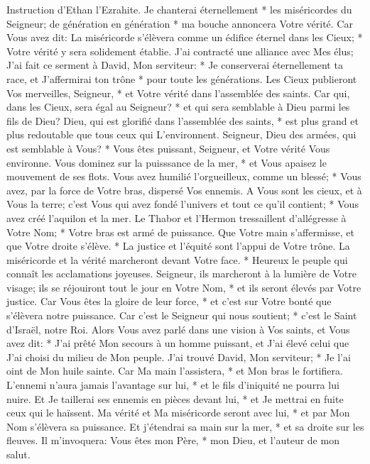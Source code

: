 Instruction d'Ethan l'Ezrahite.
Je chanterai éternellement * les miséricordes du Seigneur; de génération en génération * ma bouche annoncera Votre vérité.
Car Vous avez dit: La miséricorde s'élèvera comme un édifice éternel dans les Cieux; * Votre vérité y sera solidement établie.
J'ai contracté une alliance avec Mes élus; J'ai fait ce serment à David, Mon serviteur: *
Je conserverai éternellement ta race, et J'affermirai ton trône * pour toute les générations.
Les Cieux publieront Vos merveilles, Seigneur, * et Votre vérité dans l'assemblée des saints.
Car qui, dans les Cieux, sera égal au Seigneur? * et qui sera semblable à Dieu parmi les fils de Dieu?
Dieu, qui est glorifié dans l'assemblée des saints, * est plus grand et plus redoutable que tous ceux qui L'environnent.
Seigneur, Dieu des armées, qui est semblable à Vous? * Vous êtes puissant, Seigneur, et Votre vérité Vous environne.
Vous dominez sur la puisssance de la mer, * et Vous apaisez le mouvement de ses flots.
Vous avez humilié l'orgueilleux, comme un blessé; * Vous avez, par la force de Votre bras, dispersé Vos ennemis.
A Vous sont les cieux, et à Vous la terre; c'est Vous qui avez fondé l'univers et tout ce qu'il contient; *
Vous avez créé l'aquilon et la mer. Le Thabor et l'Hermon tressaillent d'allégresse à Votre Nom; *
Votre bras est armé de puissance. Que Votre main s'affermisse, et que Votre droite s'élève. *
La justice et l'équité sont l'appui de Votre trône. La miséricorde et la vérité marcheront devant Votre face. *
Heureux le peuple qui connaît les acclamations joyeuses. Seigneur, ils marcheront à la lumière de Votre visage;
ils se réjouiront tout le jour en Votre Nom, * et ils seront élevés par Votre justice.
Car Vous êtes la gloire de leur force, * et c'est sur Votre bonté que s'élèvera notre puissance.
Car c'est le Seigneur qui nous soutient; * c'est le Saint d'Israël, notre Roi.
Alors Vous avez parlé dans une vision à Vos saints, et Vous avez dit: * J'ai prêté Mon secours à un homme puissant, et J'ai élevé celui que J'ai choisi du milieu de Mon peuple.
J'ai trouvé David, Mon serviteur; * Je l'ai oint de Mon huile sainte.
Car Ma main l'assistera, * et Mon bras le fortifiera.
L'ennemi n'aura jamais l'avantage sur lui, * et le fils d'iniquité ne pourra lui nuire.
Et Je taillerai ses ennemis en pièces devant lui, * et Je mettrai en fuite ceux qui le haïssent.
Ma vérité et Ma miséricorde seront avec lui, * et par Mon Nom s'élèvera sa puissance.
Et j'étendrai sa main sur la mer, * et sa droite sur les fleuves.
Il m'invoquera: Vous êtes mon Père, * mon Dieu, et l'auteur de mon salut.
